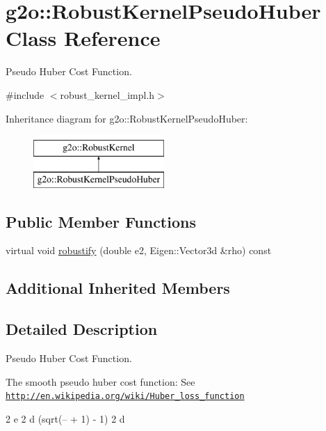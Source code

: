 \hypertarget{classg2o_1_1_robust_kernel_pseudo_huber}{}\section{g2o\+:\+:Robust\+Kernel\+Pseudo\+Huber Class Reference}
\label{classg2o_1_1_robust_kernel_pseudo_huber}


Pseudo Huber Cost Function.  




{\ttfamily \#include $<$robust\+\_\+kernel\+\_\+impl.\+h$>$}

Inheritance diagram for g2o\+:\+:Robust\+Kernel\+Pseudo\+Huber\+:\begin{figure}[H]
\begin{center}
\leavevmode
\includegraphics[height=2.000000cm]{classg2o_1_1_robust_kernel_pseudo_huber}
\end{center}
\end{figure}
\subsection*{Public Member Functions}
\begin{DoxyCompactItemize}
\item 
virtual void \mbox{\hyperlink{classg2o_1_1_robust_kernel_pseudo_huber_a7dab9bbb0e6f204a5f863220d606b0da}{robustify}} (double e2, Eigen\+::\+Vector3d \&rho) const
\end{DoxyCompactItemize}
\subsection*{Additional Inherited Members}


\subsection{Detailed Description}
Pseudo Huber Cost Function. 

The smooth pseudo huber cost function\+: See \href{http://en.wikipedia.org/wiki/Huber_loss_function}{\tt http\+://en.\+wikipedia.\+org/wiki/\+Huber\+\_\+loss\+\_\+function}

2 e 2 d (sqrt(-- + 1) -\/ 1) 2 d 

